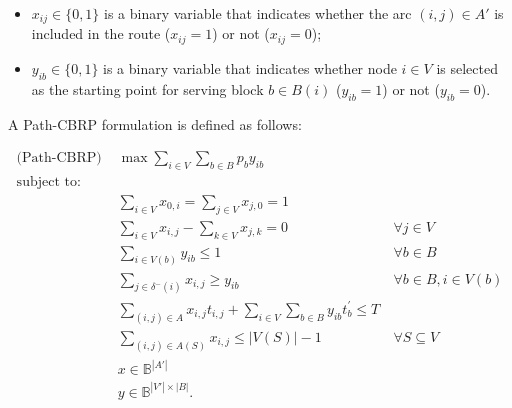 \begin{itemize}
	\item $x_{ij} \in \{0, 1\}$ is a binary variable that indicates whether the arc $(i, j) \in A'$ is included in the route ($x_{ij} = 1$) or not ($x_{ij} = 0$);
	\item $y_{ib} \in \{0, 1\}$ is a binary variable that indicates whether node $i \in V$ is selected as the starting point for serving block $b \in B(i)$ ($y_{ib} = 1$) or not ($y_{ib} = 0$).
\end{itemize}

A Path-CBRP formulation is defined as follows:
\allowdisplaybreaks

\begin{align}
	\text{(Path-CBRP) }          & \max \sum_{i \in V} \sum_{b \in B} p_b y_{ib}                                             & \label{eq:of}                                                  \\
	\nonumber \text{subject to:} &                                                                                           &                                                                \\
	                             & \sum_{i \in V} x_{0,i} = \sum_{j \in V} x_{j,0} = 1                                       & \label{eq:s-t-all}                                             \\
	                             & \sum_{i \in V} x_{i,j} - \sum_{k \in V} x_{j,k} = 0                                       & \ \forall j \in V \label{eq:flow-conservation}                 \\
	                             & \sum_{i \in V(b)} y_{ib} \leq 1                                                           & \ \forall b \in B \label{eq:max-attend}                        \\
	                             & \sum_{j \in \delta^{-}(i)} x_{i,j} \geq y_{ib}                                            & \ \forall b \in B, i \in V(b) \label{eq:in-path}               \\
	                             & \sum_{(i, j) \in A} x_{i,j}t_{i,j} + \sum_{i \in V} \sum_{b \in B} y_{ib}t^{'}_{b} \leq T & \label{eq:max-time}                                            \\
	                             & \sum_{(i, j) \in A(S)} x_{i,j} \leq |V(S)| - 1                                            & \ \forall S \subseteq V \label{eq:circuit-subtour-elimination} \\
	                             & x \in \mathbb{B}^{|A'|}                                                                   & \label{eq:dom-x}                                               \\
	                             & y \in \mathbb{B}^{|V'| \times |B|}.                                                       & \label{eq:dom-y}
\end{align}


